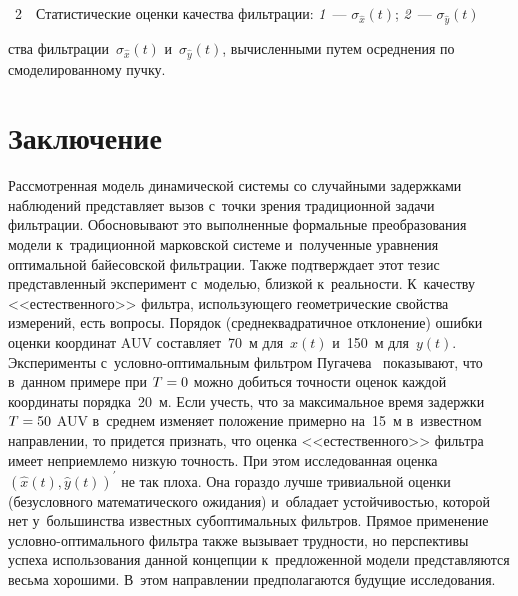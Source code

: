 \begin{multicols}{2}
{\vspace*{-4pt}

\noindent
{{\figurename~2}\ \ \small{Статистические оценки качества фильт\-ра\-ции: \textit{1}~--- $\sigma_{\hat{x}}(t)$; 
\textit{2}~--- $\sigma_{\hat{y}}(t)$
}}}


\addtocounter{figure}{1}

\pagebreak

\noindent
ства фильт\-ра\-ции~$\sigma_{\hat{x}}(t)$ 
и~$\sigma_{\hat{y}}(t)$, вы\-чис\-лен\-ны\-ми путем осред\-не\-ния по 
смоделированному \mbox{пучку}.
     
   \vspace*{-6pt}   

\section{Заключение}

     Рассмотренная модель динамической сис\-те\-мы со случайными 
задержками наблюдений пред\-став\-ля\-ет вызов с~точ\-ки зрения 
традиционной задачи фильт\-ра\-ции. Обосновывают это выполненные 
формальные преобразования модели к~традиционной марковской сис\-те\-ме 
и~полученные урав\-не\-ния оптимальной байесовской фильт\-ра\-ции. Также 
под\-тверж\-да\-ет этот тезис пред\-став\-лен\-ный эксперимент с~мо\-делью, 
близкой к~ре\-аль\-ности. К~качеству <<естественного>> фильт\-ра,  
ис\-поль\-зу\-юще\-го гео\-мет\-ри\-че\-ские свойства измерений, есть 
вопросы. Порядок (сред\-не\-квад\-ра\-тич\-ное отклонение) ошиб\-ки оценки 
координат AUV составляет~70~м для~$x(t)$ и~150~м для~$y(t)$. 
Эксперименты с~услов\-но-оп\-ти\-маль\-ным фильт\-ром  
Пугачева~\cite{22-bos, 23-bos} показывают, что в~данном примере при 
$T\hm=0$ можно добиться точ\-ности оценок каждой координаты порядка~20~м. 
Если учесть, что за максимальное время задержки $T\hm=50$ AUV 
в~сред\-нем изменяет положение примерно на~15~м в~известном  
на\-прав\-ле\-нии, то придется при\-знать, что оценка <<естественного>> 
фильт\-ра имеет неприемлемо низ\-кую точ\-ность. При этом исследованная 
оценка $\left( \hat{x}(t), \hat{y}(t)\right)^\prime$ не так плоха. Она гораздо 
лучше тривиальной оцен\-ки (безуслов\-но\-го математического ожидания) 
и~обладает устой\-чи\-востью, которой нет у~большинства известных 
субоптимальных фильт\-ров. Прямое применение  
услов\-но-оп\-ти\-маль\-но\-го фильт\-ра так\-же вызывает трудности, но 
перспективы успеха использования данной концепции к~предложенной 
модели представляются весьма хорошими. В~этом на\-прав\-ле\-нии 
предполагаются будущие ис\-сле\-до\-ва\-ния.


\end{multicols}
